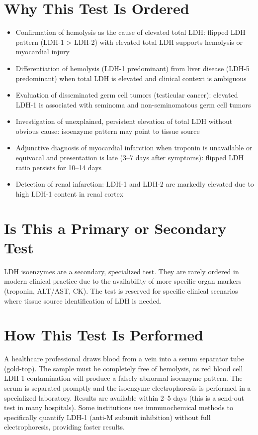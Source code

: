 \section*{Why This Test Is Ordered}
\begin{itemize}
  \item Confirmation of hemolysis as the cause of elevated total LDH: flipped LDH pattern (LDH-1 > LDH-2) with elevated total LDH supports hemolysis or myocardial injury
  \item Differentiation of hemolysis (LDH-1 predominant) from liver disease (LDH-5 predominant) when total LDH is elevated and clinical context is ambiguous
  \item Evaluation of disseminated germ cell tumors (testicular cancer): elevated LDH-1 is associated with seminoma and non-seminomatous germ cell tumors
  \item Investigation of unexplained, persistent elevation of total LDH without obvious cause: isoenzyme pattern may point to tissue source
  \item Adjunctive diagnosis of myocardial infarction when troponin is unavailable or equivocal and presentation is late (3--7 days after symptoms): flipped LDH ratio persists for 10--14 days
  \item Detection of renal infarction: LDH-1 and LDH-2 are markedly elevated due to high LDH-1 content in renal cortex
\end{itemize}

\section*{Is This a Primary or Secondary Test}
LDH isoenzymes are a secondary, specialized test. They are rarely ordered in modern clinical practice due to the availability of more specific organ markers (troponin, ALT/AST, CK). The test is reserved for specific clinical scenarios where tissue source identification of LDH is needed.

\section*{How This Test Is Performed}
A healthcare professional draws blood from a vein into a serum separator tube (gold-top). The sample must be completely free of hemolysis, as red blood cell LDH-1 contamination will produce a falsely abnormal isoenzyme pattern. The serum is separated promptly and the isoenzyme electrophoresis is performed in a specialized laboratory. Results are available within 2--5 days (this is a send-out test in many hospitals). Some institutions use immunochemical methods to specifically quantify LDH-1 (anti-M subunit inhibition) without full electrophoresis, providing faster results.

